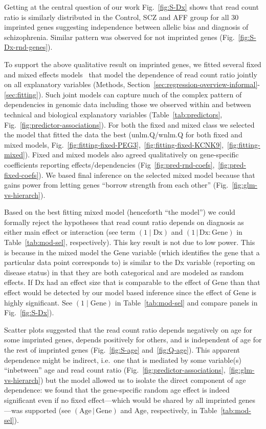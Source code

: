 \documentclass[letterpaper]{article}
\begin{document}
Getting at the central question of our work Fig.~\ref{fig:S-Dx} shows
that read count ratio is similarly distributed in the Control, SCZ and AFF
group for all 30 imprinted genes suggesting independence between allelic bias and diagnosis of
schizophrenia.  Similar pattern was observed for not imprinted genes
(Fig.~\ref{fig:S-Dx-rnd-genes}).

To support the above qualitative result on imprinted genes, we fitted several
fixed and mixed effects models~\cite{Hoffman2016} that model the dependence of
read count ratio jointly on all explanatory variables (Methods,
Section~\ref{sec:regression-overview-informal}-\ref{sec:fitting}).  Such joint
models can capture much of the complex pattern of dependencies in genomic data
including those we observed within and between technical and biological
explanatory variables (Table~\ref{tab:predictors},
Fig.~\ref{fig:predictor-associations}).  For both the fixed and mixed class we
selected the model that fitted the data the best (unlm.Q/wnlm.Q for both fixed
and mixed models,
Fig.~\ref{fig:fitting-fixed-PEG3},~\ref{fig:fitting-fixed-KCNK9},~\ref{fig:fitting-mixed}).
Fixed and mixed models also agreed qualitatively on gene-specific coefficients
reporting effects/dependencies
(Fig~\ref{fig:pred-rnd-coefs},~\ref{fig:pred-fixed-coefs}). We based final
inference on the selected mixed model because that gains power from letting
genes ``borrow strength from each other'' (Fig.~\ref{fig:glm-vs-hierarch}).

Based on the best fitting mixed model (henceforth ``the model'') we could
formally reject the hypotheses that read count ratio depends on diagnosis as
either main effect or interaction (see term \((1\mid\mathrm{Dx})\) and
\((1\,|\,\mathrm{Dx}:\mathrm{Gene})\) in Table~\ref{tab:mod-sel},
respectively).  This key result is not due to low power. This is because in
the mixed model the Gene variable (which identifies the gene that a particular
data point corresponds to) is similar to the Dx variable (reporting on disease
status) in that they are both categorical and are modeled as random effects.
If Dx had an effect size that is comparable to the effect of Gene than that
effect would be detected by our model based inference since the effect of Gene
is highly significant. See \((1\mid\mathrm{Gene})\) in Table~\ref{tab:mod-sel}
and compare panels in Fig.~\ref{fig:S-Dx}).

Scatter plots suggested that the read count ratio depends negatively on age
for some imprinted genes, depends positively for others, and is independent of
age for the rest of imprinted genes (Fig.~\ref{fig:S-age}
and~\ref{fig:Q-age}).  This apparent dependence might be indirect, i.e.~one
that is mediated by some variable(s) ``inbetween'' age and read count ratio
(Fig.~\ref{fig:predictor-associations},~\ref{fig:glm-vs-hierarch}) but the
model allowed us to isolate the direct component of age dependence: we found
that the gene-specific random age effect is indeed significant even if no
fixed effect---which would be shared by all imprinted genes---was supported
(see \((\mathrm{Age}\,|\,\mathrm{Gene})\) and \(\mathrm{Age}\), respectively,
in Table~\ref{tab:mod-sel}).
\end{document}

